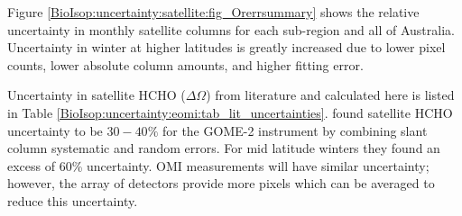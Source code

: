     
    Figure \ref{BioIsop:uncertainty:satellite:fig_Orerrsummary} shows the relative uncertainty in monthly satellite columns for each sub-region and all of Australia.
    Uncertainty in winter at higher latitudes is greatly increased due to lower pixel counts, lower absolute column amounts, and higher fitting error.
    
    
    
    
    Uncertainty in satellite HCHO ($\Delta{\Omega}$) from literature and calculated here is listed in Table \ref{BioIsop:uncertainty:eomi:tab_lit_uncertainties}.
    \textcite{DeSmedt2012} found satellite HCHO uncertainty to be $30-40\%$ for the GOME-2 instrument by combining slant column systematic and random errors.
    For mid latitude winters they found an excess of 60\% uncertainty.
    OMI measurements will have similar  uncertainty; however, the array of detectors provide more pixels which can be averaged to reduce this uncertainty.
    

